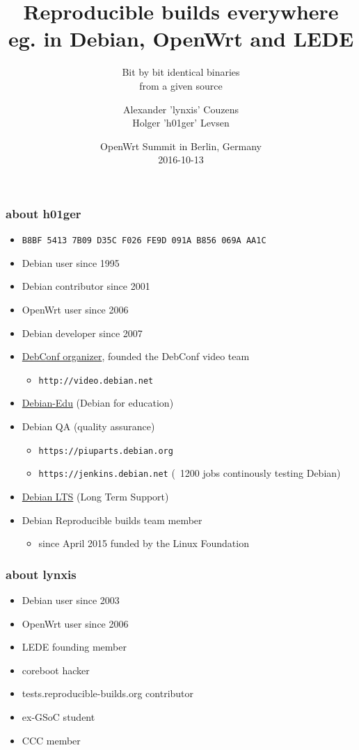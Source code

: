 \documentclass[14pt,aspectratio=169]{beamer}
\title[Reproducible builds everywhere]{Reproducible
builds everywhere \\ eg. in Debian, OpenWrt and LEDE}
\subtitle{Bit by bit identical binaries \\
from a given source}
\author[h01ger and lynxis]{%
   \texorpdfstring{
            \centering
            Alexander 'lynxis' Couzens\\
            Holger 'h01ger' Levsen
   }{h01ger and lynxis}}
\date[OpenWrt Summit, Berlin]{%
 OpenWrt Summit in Berlin, Germany\\
 \small{2016-10-13}}
\begin{document}
\begin{frame}[plain]
 \titlepage
\end{frame}

\begin{frame}
 \frametitle{about h01ger}

 \begin{itemize}
  \item \small{\texttt{B8BF 5413 7B09 D35C F026  FE9D 091A B856 069A AA1C}}
  \item Debian user since 1995
  \item Debian contributor since 2001
  \item OpenWrt user since 2006
  \item Debian developer since 2007
  \item \underline{DebConf organizer},
  founded the DebConf video team
   \begin{itemize}
    \item \texttt{http://video.debian.net}
   \end{itemize}
 \item \underline{Debian-Edu} (Debian for education)
  \item Debian QA (quality assurance)
  \begin{itemize}
   \item \texttt{https://piuparts.debian.org}
   \item \texttt{https://jenkins.debian.net} (~1200 jobs continously testing Debian)
  \end{itemize}
  \item \underline{Debian LTS} (Long Term Support)
  \item Debian Reproducible builds team member
  \begin{itemize}
   \item since April 2015 funded by the Linux Foundation
 \end{itemize}
 \end{itemize}
\end{frame}

\begin{frame}
 \frametitle{about lynxis}

 \begin{itemize}
  \item Debian user since 2003
  \item OpenWrt user since 2006
  \item LEDE founding member
  \item coreboot hacker
  \item tests.reproducible-builds.org contributor
  \item ex-GSoC student
  \item CCC member
 \end{itemize}
\end{frame}
\end{document}
